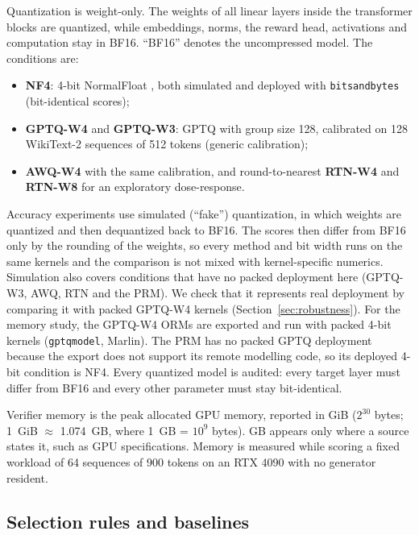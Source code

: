 Quantization is weight-only. The weights of all linear layers inside the transformer
blocks are quantized, while embeddings, norms, the reward head, activations and
computation stay in BF16. ``BF16'' denotes the uncompressed model. The conditions are:
\begin{itemize}
\item \textbf{NF4}: 4-bit NormalFloat \cite{dettmers2023qlora}, both simulated and
deployed with \texttt{bitsandbytes} (bit-identical scores);
\item \textbf{GPTQ-W4} and \textbf{GPTQ-W3}: GPTQ \cite{frantar2023gptq} with group
size 128, calibrated on 128 WikiText-2 sequences of 512 tokens (generic calibration);
\item \textbf{AWQ-W4} \cite{lin2024awq} with the same calibration, and round-to-nearest
\textbf{RTN-W4} and \textbf{RTN-W8} for an exploratory dose-response.
\end{itemize}
Accuracy experiments use simulated (``fake'') quantization, in which weights are
quantized and then dequantized back to BF16. The scores then differ from BF16 only by the
rounding of the weights, so every method and bit width runs on the same kernels and the
comparison is not mixed with kernel-specific numerics. Simulation also covers conditions
that have no packed deployment here (GPTQ-W3, AWQ, RTN and the PRM). We check that it
represents real deployment by comparing it with packed GPTQ-W4 kernels
(Section~\ref{sec:robustness}). For the memory
study, the GPTQ-W4 ORMs are exported and run with packed 4-bit kernels
(\texttt{gptqmodel}, Marlin). The PRM has no packed GPTQ deployment because the export
does not support its remote modelling code, so its deployed 4-bit condition is NF4.
Every quantized model is audited: every target layer must differ from BF16 and every
other parameter must stay bit-identical.

Verifier memory is the peak allocated GPU memory, reported in GiB ($2^{30}$ bytes; 1~GiB
$\approx$ 1.074~GB, where 1~GB = $10^9$ bytes). GB appears only where a source states
it, such as GPU specifications. Memory is measured while
scoring a fixed workload of 64 sequences of 900 tokens on an RTX 4090 with no generator
resident.

\subsection{Selection rules and baselines}\label{sec:selection}

